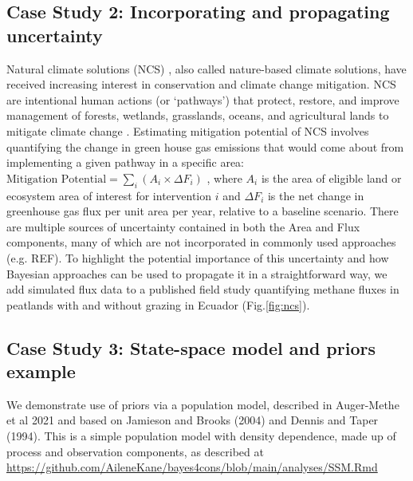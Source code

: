 \documentclass{article}
\begin{document}
\subsection*{Case Study 2: Incorporating and propagating uncertainty}

\par Natural climate solutions (NCS) \citep{ellis2024principles}, also called nature-based climate solutions, have received increasing interest in conservation and climate change mitigation. NCS are intentional human actions (or `pathways') that protect, restore, and improve management of forests, wetlands, grasslands, oceans, and agricultural lands to mitigate climate change \citep{griscom2017natural}. Estimating mitigation potential of NCS involves quantifying the change in green house gas emissions that would come about from implementing a given pathway in a specific area:
\(\text{Mitigation\ Potential}=\sum _{i}\left(A_{i}\times \Delta F_{i}\right)\)
, where \(A_{i}\) is the area of eligible land or ecosystem area of interest for intervention \(i\) and \(\Delta F_i\) is the net change in greenhouse gas flux per unit area per year, relative to a baseline scenario. There are multiple sources of uncertainty contained in both the Area and Flux components, many of which are not incorporated in commonly used approaches (e.g. REF). To highlight the potential importance of this uncertainty and how Bayesian approaches can be used to propagate it in a straightforward way, we add simulated flux data to a published field study quantifying methane fluxes in peatlands with and without grazing in Ecuador \citep{sanchez2017carbon} (Fig.\ref{fig:ncs}).  %

\subsection*{Case Study 3: State-space model and priors example}  %
\par We demonstrate use of priors via a population model, described in Auger-Methe et al 2021 and based on Jamieson and Brooks (2004) and Dennis and Taper (1994). This is a simple population model with density dependence, made up of process and observation components, as described at \href{https://github.com/AileneKane/bayes4cons/blob/main/analyses/SSM.Rmd}{https://github.com/AileneKane/bayes4cons/blob/main/analyses/SSM.Rmd}
\end{document}
